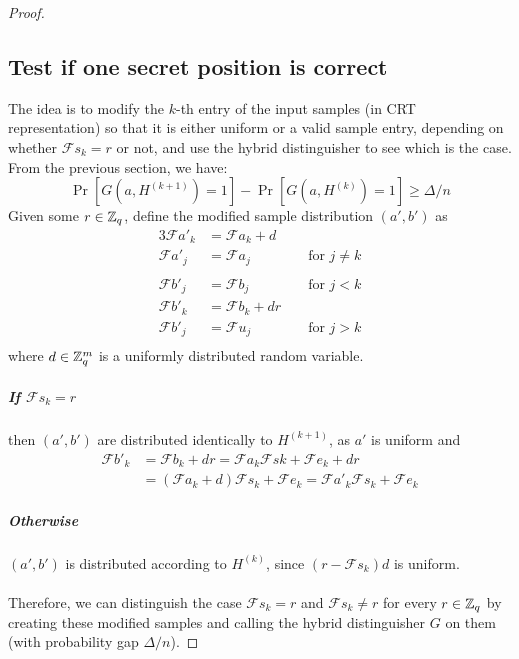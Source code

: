 \begin{proof}
\subsection{Test if one secret position is correct}
The idea is to modify the $k$-th entry of the input samples (in CRT representation) so that it is either uniform or a valid sample entry, depending on whether $\mathcal{F}s_k = r$ or not, and use the hybrid distinguisher to see which is the case. From the previous section, we have:
\begin{equation}
\Pr[G(a, H^{(k + 1)}) = 1] - \Pr[G(a, H^{(k)}) = 1] \geq \Delta / n \nonumber
\end{equation}
Given some $r \in \mathbb{Z}_q$, define the modified sample distribution $(a', b')$ as
\begin{alignat*}{3}
\mathcal{F}a'_k &= \mathcal{F}a_k + d&&\\
\mathcal{F}a'_j &= \mathcal{F}a_j &&\text{ for } j \neq k\\
\\
\mathcal{F}b'_j &= \mathcal{F}b_j &&\text{ for } j < k\\
\mathcal{F}b'_k&= \mathcal{F}b_k + dr&&\\
\mathcal{F}b'_j &= \mathcal{F}u_j &&\text{ for } j > k\\
\end{alignat*}
where $d \in \mathbb{Z}_q^m$ is a uniformly distributed random variable. 
\subparagraph{If $\mathcal{F}s_k = r$} then $(a', b')$ are distributed identically to $H^{(k + 1)}$, as $a'$ is uniform and
\begin{equation}
\begin{split}
\mathcal{F}b'_k &= \mathcal{F}b_k + dr = \mathcal{F}a_k \mathcal{F}sk + \mathcal{F}e_k + dr \\
&= (\mathcal{F}a_k + d)\mathcal{F}s_k + \mathcal{F}e_k = \mathcal{F}a'_k\mathcal{F}s_k + \mathcal{F}e_k
\end{split}\nonumber
\end{equation}

\subparagraph{Otherwise} $(a', b')$ is distributed according to $H^{(k)}$, since $(r - \mathcal{F}s_k) d$ is uniform.
\\\\
Therefore, we can distinguish the case $\mathcal{F}s_k = r$ and $\mathcal{F}s_k \neq r$ for every $r \in \mathbb{Z}_q$ by creating these modified samples and calling the hybrid distinguisher $G$ on them (with probability gap $\Delta / n$).


\end{proof}
